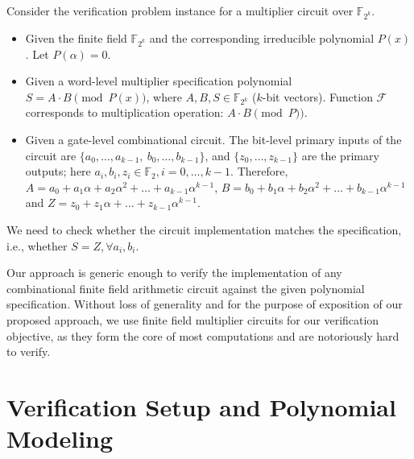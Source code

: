 \begin{Example}
Consider the verification problem instance for a multiplier circuit
over $\mathbb{F}_{2^k}$. 
\begin{itemize}

\item Given the finite field $\mathbb{F}_{2^k}$ and the corresponding
  irreducible polynomial $P(x)$. Let $P(\alpha) = 0$.   

\item Given a word-level multiplier specification polynomial $S = A
  \cdot B \pmod{P(x)}$,  where $A, B, S \in \mathbb{F}_{2^k}$ ($k$-bit
  vectors). Function $\mathcal{F}$  corresponds to multiplication
  operation: $A\cdot B \pmod {P})$. 

\item  Given a gate-level combinational circuit. The bit-level primary
  inputs of the circuit are $\{a_0, \dots, a_{k-1}, ~b_0, 
  \dots, b_{k-1}\}$, and $\{z_0, \dots, z_{k-1}\}$ are the primary
    outputs; here $a_i, b_i, z_i \in \mathbb{F}_2, i = 0, \dots, k-1$. 
    Therefore, $A = a_0 + a_1\alpha + a_2\alpha^2 + \dots +    a_{k-1}\alpha^{k-1}$,
    $ B = b_0 + b_1 \alpha + b_2\alpha^2 + \dots +    b_{k-1}\alpha^{k-1}$ 
    and $Z = z_0 + z_1\alpha  + \dots +  z_{k-1}\alpha^{k-1}$.   
    
\end{itemize}
 We need to check whether the circuit implementation matches the
 specification, i.e., whether $S=Z, \forall a_{i},b_{i}$. 
	
\end{Example}

Our approach is generic enough to verify the implementation of any
combinational finite field arithmetic circuit against the given
polynomial specification. Without loss of generality and for the
purpose of exposition of our proposed approach, we use finite
field multiplier circuits for our verification objective, as they form
the core of most computations and are notoriously hard to verify. 

\section{Verification Setup and Polynomial Modeling}
\label{sec:formulation}


